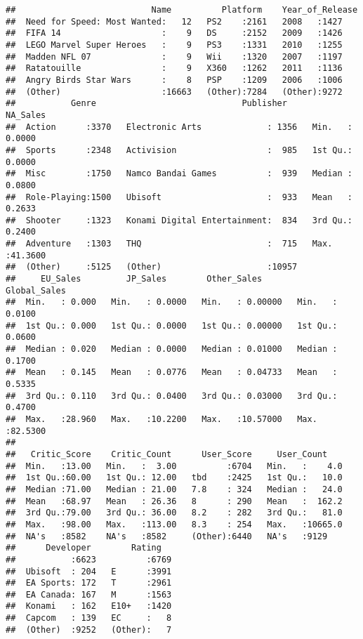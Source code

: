 \documentclass[]{article}
\begin{document}
\begin{verbatim}
##                           Name          Platform    Year_of_Release
##  Need for Speed: Most Wanted:   12   PS2    :2161   2008   :1427   
##  FIFA 14                    :    9   DS     :2152   2009   :1426   
##  LEGO Marvel Super Heroes   :    9   PS3    :1331   2010   :1255   
##  Madden NFL 07              :    9   Wii    :1320   2007   :1197   
##  Ratatouille                :    9   X360   :1262   2011   :1136   
##  Angry Birds Star Wars      :    8   PSP    :1209   2006   :1006   
##  (Other)                    :16663   (Other):7284   (Other):9272   
##           Genre                             Publisher        NA_Sales      
##  Action      :3370   Electronic Arts             : 1356   Min.   : 0.0000  
##  Sports      :2348   Activision                  :  985   1st Qu.: 0.0000  
##  Misc        :1750   Namco Bandai Games          :  939   Median : 0.0800  
##  Role-Playing:1500   Ubisoft                     :  933   Mean   : 0.2633  
##  Shooter     :1323   Konami Digital Entertainment:  834   3rd Qu.: 0.2400  
##  Adventure   :1303   THQ                         :  715   Max.   :41.3600  
##  (Other)     :5125   (Other)                     :10957                    
##     EU_Sales         JP_Sales        Other_Sales        Global_Sales    
##  Min.   : 0.000   Min.   : 0.0000   Min.   : 0.00000   Min.   : 0.0100  
##  1st Qu.: 0.000   1st Qu.: 0.0000   1st Qu.: 0.00000   1st Qu.: 0.0600  
##  Median : 0.020   Median : 0.0000   Median : 0.01000   Median : 0.1700  
##  Mean   : 0.145   Mean   : 0.0776   Mean   : 0.04733   Mean   : 0.5335  
##  3rd Qu.: 0.110   3rd Qu.: 0.0400   3rd Qu.: 0.03000   3rd Qu.: 0.4700  
##  Max.   :28.960   Max.   :10.2200   Max.   :10.57000   Max.   :82.5300  
##                                                                         
##   Critic_Score    Critic_Count      User_Score     User_Count     
##  Min.   :13.00   Min.   :  3.00          :6704   Min.   :    4.0  
##  1st Qu.:60.00   1st Qu.: 12.00   tbd    :2425   1st Qu.:   10.0  
##  Median :71.00   Median : 21.00   7.8    : 324   Median :   24.0  
##  Mean   :68.97   Mean   : 26.36   8      : 290   Mean   :  162.2  
##  3rd Qu.:79.00   3rd Qu.: 36.00   8.2    : 282   3rd Qu.:   81.0  
##  Max.   :98.00   Max.   :113.00   8.3    : 254   Max.   :10665.0  
##  NA's   :8582    NA's   :8582     (Other):6440   NA's   :9129     
##      Developer        Rating    
##           :6623          :6769  
##  Ubisoft  : 204   E      :3991  
##  EA Sports: 172   T      :2961  
##  EA Canada: 167   M      :1563  
##  Konami   : 162   E10+   :1420  
##  Capcom   : 139   EC     :   8  
##  (Other)  :9252   (Other):   7
\end{verbatim}
\end{document}
